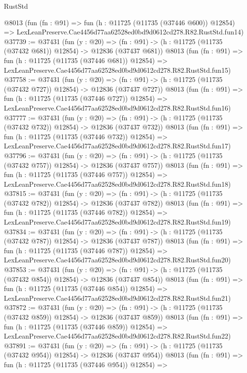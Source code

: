 \begin{lexlean}{RustStd}
\begin{coremodule}
    @8013
    (fun (fn : @91) =>
    fun (h : @11725 (@11735 (@37446 @600)) @12854) =>
    LexLeanPreserve.Cae4456d77aa62528ed0bd9d0612cd278.R82.RustStd.fun14)
@37739 := @37431
    (fun (y : @20) =>
    (fn : @91) -> (h : @11725 (@11735 (@37432 @681)) @12854) -> @12836 (@37437 @681))
    @8013
    (fun (fn : @91) =>
    fun (h : @11725 (@11735 (@37446 @681)) @12854) =>
    LexLeanPreserve.Cae4456d77aa62528ed0bd9d0612cd278.R82.RustStd.fun15)
@37758 := @37431
    (fun (y : @20) =>
    (fn : @91) -> (h : @11725 (@11735 (@37432 @727)) @12854) -> @12836 (@37437 @727))
    @8013
    (fun (fn : @91) =>
    fun (h : @11725 (@11735 (@37446 @727)) @12854) =>
    LexLeanPreserve.Cae4456d77aa62528ed0bd9d0612cd278.R82.RustStd.fun16)
@37777 := @37431
    (fun (y : @20) =>
    (fn : @91) -> (h : @11725 (@11735 (@37432 @732)) @12854) -> @12836 (@37437 @732))
    @8013
    (fun (fn : @91) =>
    fun (h : @11725 (@11735 (@37446 @732)) @12854) =>
    LexLeanPreserve.Cae4456d77aa62528ed0bd9d0612cd278.R82.RustStd.fun17)
@37796 := @37431
    (fun (y : @20) =>
    (fn : @91) -> (h : @11725 (@11735 (@37432 @757)) @12854) -> @12836 (@37437 @757))
    @8013
    (fun (fn : @91) =>
    fun (h : @11725 (@11735 (@37446 @757)) @12854) =>
    LexLeanPreserve.Cae4456d77aa62528ed0bd9d0612cd278.R82.RustStd.fun18)
@37815 := @37431
    (fun (y : @20) =>
    (fn : @91) -> (h : @11725 (@11735 (@37432 @782)) @12854) -> @12836 (@37437 @782))
    @8013
    (fun (fn : @91) =>
    fun (h : @11725 (@11735 (@37446 @782)) @12854) =>
    LexLeanPreserve.Cae4456d77aa62528ed0bd9d0612cd278.R82.RustStd.fun19)
@37834 := @37431
    (fun (y : @20) =>
    (fn : @91) -> (h : @11725 (@11735 (@37432 @787)) @12854) -> @12836 (@37437 @787))
    @8013
    (fun (fn : @91) =>
    fun (h : @11725 (@11735 (@37446 @787)) @12854) =>
    LexLeanPreserve.Cae4456d77aa62528ed0bd9d0612cd278.R82.RustStd.fun20)
@37853 := @37431
    (fun (y : @20) =>
    (fn : @91) -> (h : @11725 (@11735 (@37432 @854)) @12854) -> @12836 (@37437 @854))
    @8013
    (fun (fn : @91) =>
    fun (h : @11725 (@11735 (@37446 @854)) @12854) =>
    LexLeanPreserve.Cae4456d77aa62528ed0bd9d0612cd278.R82.RustStd.fun21)
@37872 := @37431
    (fun (y : @20) =>
    (fn : @91) -> (h : @11725 (@11735 (@37432 @859)) @12854) -> @12836 (@37437 @859))
    @8013
    (fun (fn : @91) =>
    fun (h : @11725 (@11735 (@37446 @859)) @12854) =>
    LexLeanPreserve.Cae4456d77aa62528ed0bd9d0612cd278.R82.RustStd.fun22)
@37891 := @37431
    (fun (y : @20) =>
    (fn : @91) -> (h : @11725 (@11735 (@37432 @954)) @12854) -> @12836 (@37437 @954))
    @8013
    (fun (fn : @91) =>
    fun (h : @11725 (@11735 (@37446 @954)) @12854) =>

\end{coremodule}
\end{lexlean}

